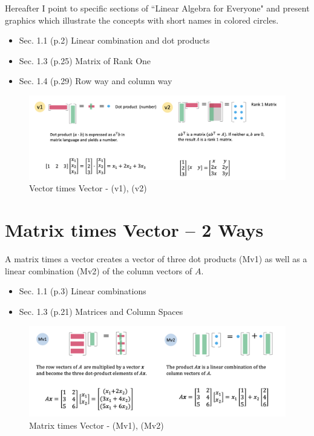 \documentclass[letterpaper]{article}
\begin{document}
Hereafter I point to specific sections of ``Linear Algebra for Everyone" 
and present graphics which illustrate the concepts with short names
in colored circles.

\begin{itemize}
  \item Sec. 1.1 (p.2) Linear combination and dot products
  \item Sec. 1.3 (p.25) Matrix of Rank One
  \item Sec. 1.4 (p.29) Row way and column way
\end{itemize} 


\begin{figure}[H]
  \includegraphics[keepaspectratio, width=\linewidth]{VectorTimesVector.png}
  \caption{Vector times Vector - (v1), (v2)}
\end{figure}

\section{Matrix times Vector -- 2 Ways}

A matrix times a vector creates a vector of three dot products (Mv1)
as well as a linear combination (Mv2) of the column vectors of $A$.

\begin{itemize}
  \item Sec. 1.1 (p.3) Linear combinations
  \item Sec. 1.3 (p.21) Matrices and Column Spaces
\end{itemize} 

\begin{figure}[H]
  \includegraphics[keepaspectratio, width=\linewidth]{MatrixTimesVector.png}
  \caption{Matrix times Vector - (Mv1), (Mv2)}
\end{figure}
\end{document}
